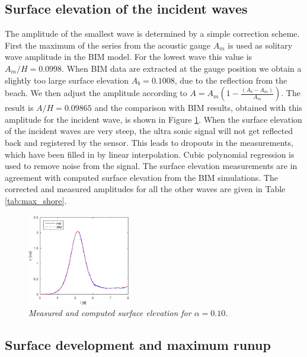 \documentclass[review, authoryear]{elsarticle}
\begin{document}
\subsection{Surface elevation of the incident waves}
\label{surf_elev}
The amplitude of the smallest wave is determined by
a simple correction scheme. First the maximum of the series from the 
acoustic gauge $A_m$ is used as solitary wave amplitude in the BIM model.
For the lowest wave this value is $A_m/H=0.0998$.
When BIM data are extracted at the gauge position we obtain 
a slightly too large surface elevation $A_b=0.1008$, due to the reflection from 
the beach. We then adjust the amplitude 
according to $A=A_m (1- \frac{ (A_b-A_m)}{A_m})$. 
The result is $A/H=0.09865$ and the comparison with BIM results, obtained with this amplitude for the incident wave, is shown in Figure \ref{fig:surf_ele1}. When the surface elevation of the incident waves are very steep, the ultra sonic signal will not get reflected back and registered by the sensor. This leads to dropouts in the measurements, which have been filled in by linear interpolation.  Cubic polynomial regression is used to remove noise from the signal. The surface elevation measurements are in agreement with computed surface elevation from the BIM simulations. The corrected and measured amplitudes for all the other waves are given in Table \ref{tab:max_shore}.



\begin{figure}
\centering
\includegraphics[width=0.4\textwidth]{./Figures/surf_ele10_2016.eps}
\caption{\textit{Measured and computed surface elevation for $\alpha=0.10$.}}
\label{fig:surf_ele1}
\end{figure}


\subsection{Surface development and maximum runup}
\label{max_run}
\end{document}
